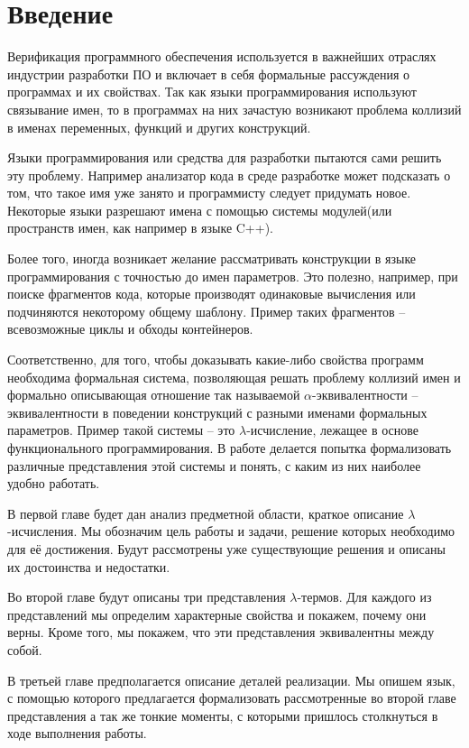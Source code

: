 \section*{Введение}

Верификация программного обеспечения используется в важнейших отраслях индустрии разработки ПО и включает в себя формальные рассуждения о программах и их свойствах. Так как языки программирования используют связывание имен, то в программах на них зачастую возникают проблема коллизий в именах переменных, функций и других конструкций.

Языки программирования или средства для разработки пытаются сами решить эту проблему. Например анализатор кода в среде разработке может подсказать о том, что такое имя уже занято и программисту следует придумать новое. Некоторые языки разрешают имена с помощью системы модулей(или пространств имен, как например в языке C++).

Более того, иногда возникает желание рассматривать конструкции в языке программирования с точностью до имен параметров. Это полезно, например, при поиске фрагментов кода, которые производят одинаковые вычисления или подчиняются некоторому общему шаблону. Пример таких фрагментов -- всевозможные циклы и обходы контейнеров.

Соответственно, для того, чтобы доказывать какие-либо свойства программ необходима формальная система, позволяющая решать проблему коллизий имен и формально описывающая отношение так называемой $\alpha$-эквивалентности -- эквивалентности в поведении конструкций с разными именами формальных параметров. Пример такой системы -- это $\lambda$-исчисление, лежащее в основе функционального программирования. В работе делается попытка формализовать различные представления этой системы и понять, с каким из них наиболее удобно работать.

В первой главе будет дан анализ предметной области, краткое описание $\lambda$-исчисления. Мы обозначим цель работы и задачи, решение которых необходимо для её достижения. Будут рассмотрены уже существующие решения и описаны их достоинства и недостатки.

Во второй главе будут описаны три представления $\lambda$-термов. Для каждого из представлений мы определим характерные свойства и покажем, почему они верны. Кроме того, мы покажем, что эти представления эквивалентны между собой.

В третьей главе предполагается описание деталей реализации. Мы опишем язык, с помощью которого предлагается формализовать рассмотренные во второй главе представления а так же тонкие моменты, с которыми пришлось столкнуться в ходе выполнения работы.
